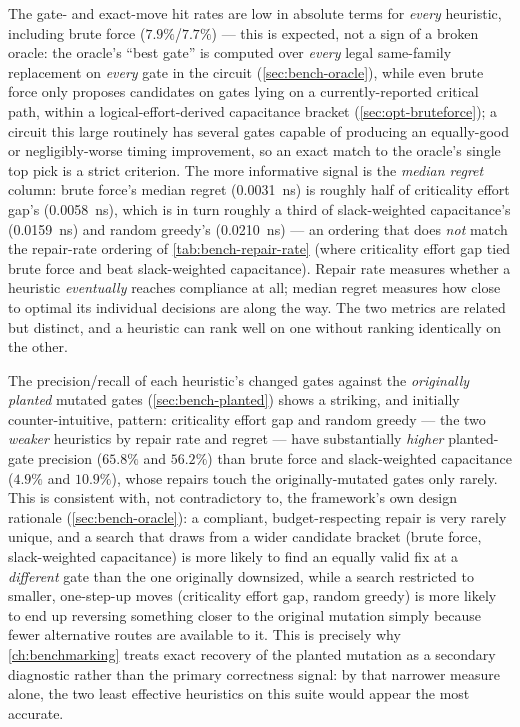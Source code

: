 The gate- and exact-move hit rates are low in absolute terms for
\emph{every} heuristic, including brute force ($7.9\%$/$7.7\%$) --- this
is expected, not a sign of a broken oracle: the oracle's ``best gate'' is
computed over \emph{every} legal same-family replacement on \emph{every}
gate in the circuit (\cref{sec:bench-oracle}), while even brute force only
proposes candidates on gates lying on a currently-reported critical path,
within a logical-effort-derived capacitance bracket
(\cref{sec:opt-bruteforce}); a circuit this large routinely has several
gates capable of producing an equally-good or negligibly-worse timing
improvement, so an exact match to the oracle's single top pick is a strict
criterion. The more informative signal is the \emph{median regret} column:
brute force's median regret (0.0031~ns) is roughly half of
criticality effort gap's (0.0058~ns), which is in turn roughly a third of
slack-weighted capacitance's (0.0159~ns) and random greedy's (0.0210~ns)
--- an ordering that does \emph{not} match the repair-rate ordering of
\cref{tab:bench-repair-rate} (where criticality effort gap tied brute force
and beat slack-weighted capacitance). Repair rate measures whether a
heuristic \emph{eventually} reaches compliance at all; median regret
measures how close to optimal its individual decisions are along the way.
The two metrics are related but distinct, and a heuristic can rank well on
one without ranking identically on the other.
 
The precision/recall of each heuristic's changed gates against the
\emph{originally planted} mutated gates (\cref{sec:bench-planted}) shows a
striking, and initially counter-intuitive, pattern: criticality effort gap
and random greedy --- the two \emph{weaker} heuristics by repair rate and
regret --- have substantially \emph{higher} planted-gate precision
($65.8\%$ and $56.2\%$) than brute force and slack-weighted capacitance
($4.9\%$ and $10.9\%$), whose repairs touch the originally-mutated gates
only rarely. This is consistent with, not contradictory to, the framework's
own design rationale (\cref{sec:bench-oracle}): a compliant, budget-respecting
repair is very rarely unique, and a search that draws from a wider
candidate bracket (brute force, slack-weighted capacitance) is more likely
to find an equally valid fix at a \emph{different} gate than the one
originally downsized, while a search restricted to smaller, one-step-up
moves (criticality effort gap, random greedy) is more likely to end up
reversing something closer to the original mutation simply because fewer
alternative routes are available to it. This is precisely why
\cref{ch:benchmarking} treats exact recovery of the planted mutation as a
secondary diagnostic rather than the primary correctness signal: by that
narrower measure alone, the two least effective heuristics on this suite
would appear the most accurate.
 
